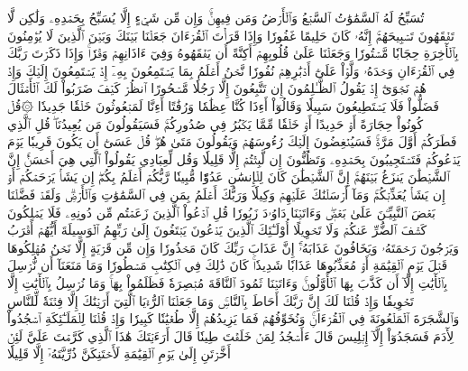 تُسَبِّحُ لَهُ ٱلسَّمَٰوَٰتُ ٱلسَّبۡعُ وَٱلۡأَرۡضُ وَمَن فِيهِنَّۚ وَإِن مِّن شَيۡءٍ إِلَّا يُسَبِّحُ بِحَمۡدِهِۦ وَلَٰكِن لَّا تَفۡقَهُونَ تَسۡبِيحَهُمۡۚ إِنَّهُۥ كَانَ حَلِيمًا غَفُورٗا
وَإِذَا قَرَأۡتَ ٱلۡقُرۡءَانَ جَعَلۡنَا بَيۡنَكَ وَبَيۡنَ ٱلَّذِينَ لَا يُؤۡمِنُونَ بِٱلۡأٓخِرَةِ حِجَابٗا مَّسۡتُورٗا
وَجَعَلۡنَا عَلَىٰ قُلُوبِهِمۡ أَكِنَّةً أَن يَفۡقَهُوهُ وَفِيٓ ءَاذَانِهِمۡ وَقۡرٗاۚ وَإِذَا ذَكَرۡتَ رَبَّكَ فِي ٱلۡقُرۡءَانِ وَحۡدَهُۥ وَلَّوۡاْ عَلَىٰٓ أَدۡبَٰرِهِمۡ نُفُورٗا
نَّحۡنُ أَعۡلَمُ بِمَا يَسۡتَمِعُونَ بِهِۦٓ إِذۡ يَسۡتَمِعُونَ إِلَيۡكَ وَإِذۡ هُمۡ نَجۡوَىٰٓ إِذۡ يَقُولُ ٱلظَّـٰلِمُونَ إِن تَتَّبِعُونَ إِلَّا رَجُلٗا مَّسۡحُورًا
ٱنظُرۡ كَيۡفَ ضَرَبُواْ لَكَ ٱلۡأَمۡثَالَ فَضَلُّواْ فَلَا يَسۡتَطِيعُونَ سَبِيلٗا
وَقَالُوٓاْ أَءِذَا كُنَّا عِظَٰمٗا وَرُفَٰتًا أَءِنَّا لَمَبۡعُوثُونَ خَلۡقٗا جَدِيدٗا
۞قُلۡ كُونُواْ حِجَارَةً أَوۡ حَدِيدًا
أَوۡ خَلۡقٗا مِّمَّا يَكۡبُرُ فِي صُدُورِكُمۡۚ فَسَيَقُولُونَ مَن يُعِيدُنَاۖ قُلِ ٱلَّذِي فَطَرَكُمۡ أَوَّلَ مَرَّةٖۚ فَسَيُنۡغِضُونَ إِلَيۡكَ رُءُوسَهُمۡ وَيَقُولُونَ مَتَىٰ هُوَۖ قُلۡ عَسَىٰٓ أَن يَكُونَ قَرِيبٗا
يَوۡمَ يَدۡعُوكُمۡ فَتَسۡتَجِيبُونَ بِحَمۡدِهِۦ وَتَظُنُّونَ إِن لَّبِثۡتُمۡ إِلَّا قَلِيلٗا
وَقُل لِّعِبَادِي يَقُولُواْ ٱلَّتِي هِيَ أَحۡسَنُۚ إِنَّ ٱلشَّيۡطَٰنَ يَنزَغُ بَيۡنَهُمۡۚ إِنَّ ٱلشَّيۡطَٰنَ كَانَ لِلۡإِنسَٰنِ عَدُوّٗا مُّبِينٗا
رَّبُّكُمۡ أَعۡلَمُ بِكُمۡۖ إِن يَشَأۡ يَرۡحَمۡكُمۡ أَوۡ إِن يَشَأۡ يُعَذِّبۡكُمۡۚ وَمَآ أَرۡسَلۡنَٰكَ عَلَيۡهِمۡ وَكِيلٗا
وَرَبُّكَ أَعۡلَمُ بِمَن فِي ٱلسَّمَٰوَٰتِ وَٱلۡأَرۡضِۗ وَلَقَدۡ فَضَّلۡنَا بَعۡضَ ٱلنَّبِيِّـۧنَ عَلَىٰ بَعۡضٖۖ وَءَاتَيۡنَا دَاوُۥدَ زَبُورٗا
قُلِ ٱدۡعُواْ ٱلَّذِينَ زَعَمۡتُم مِّن دُونِهِۦ فَلَا يَمۡلِكُونَ كَشۡفَ ٱلضُّرِّ عَنكُمۡ وَلَا تَحۡوِيلًا
أُوْلَـٰٓئِكَ ٱلَّذِينَ يَدۡعُونَ يَبۡتَغُونَ إِلَىٰ رَبِّهِمُ ٱلۡوَسِيلَةَ أَيُّهُمۡ أَقۡرَبُ وَيَرۡجُونَ رَحۡمَتَهُۥ وَيَخَافُونَ عَذَابَهُۥٓۚ إِنَّ عَذَابَ رَبِّكَ كَانَ مَحۡذُورٗا
وَإِن مِّن قَرۡيَةٍ إِلَّا نَحۡنُ مُهۡلِكُوهَا قَبۡلَ يَوۡمِ ٱلۡقِيَٰمَةِ أَوۡ مُعَذِّبُوهَا عَذَابٗا شَدِيدٗاۚ كَانَ ذَٰلِكَ فِي ٱلۡكِتَٰبِ مَسۡطُورٗا
وَمَا مَنَعَنَآ أَن نُّرۡسِلَ بِٱلۡأٓيَٰتِ إِلَّآ أَن كَذَّبَ بِهَا ٱلۡأَوَّلُونَۚ وَءَاتَيۡنَا ثَمُودَ ٱلنَّاقَةَ مُبۡصِرَةٗ فَظَلَمُواْ بِهَاۚ وَمَا نُرۡسِلُ بِٱلۡأٓيَٰتِ إِلَّا تَخۡوِيفٗا
وَإِذۡ قُلۡنَا لَكَ إِنَّ رَبَّكَ أَحَاطَ بِٱلنَّاسِۚ وَمَا جَعَلۡنَا ٱلرُّءۡيَا ٱلَّتِيٓ أَرَيۡنَٰكَ إِلَّا فِتۡنَةٗ لِّلنَّاسِ وَٱلشَّجَرَةَ ٱلۡمَلۡعُونَةَ فِي ٱلۡقُرۡءَانِۚ وَنُخَوِّفُهُمۡ فَمَا يَزِيدُهُمۡ إِلَّا طُغۡيَٰنٗا كَبِيرٗا
وَإِذۡ قُلۡنَا لِلۡمَلَـٰٓئِكَةِ ٱسۡجُدُواْ لِأٓدَمَ فَسَجَدُوٓاْ إِلَّآ إِبۡلِيسَ قَالَ ءَأَسۡجُدُ لِمَنۡ خَلَقۡتَ طِينٗا
قَالَ أَرَءَيۡتَكَ هَٰذَا ٱلَّذِي كَرَّمۡتَ عَلَيَّ لَئِنۡ أَخَّرۡتَنِ إِلَىٰ يَوۡمِ ٱلۡقِيَٰمَةِ لَأَحۡتَنِكَنَّ ذُرِّيَّتَهُۥٓ إِلَّا قَلِيلٗا

